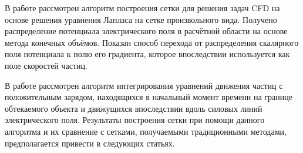 \documentclass[a4paper,12pt]{article}
\begin{document}
В работе рассмотрен алгоритм построения сетки для решения задач CFD на основе  решения уравнения Лапласа на сетке произвольного вида. Получено распределение потенциала электрического поля в расчётной области на основе метода конечных объёмов. Показан способ перехода от распределения скалярного поля потенциала к полю его градиента, которое впоследствии используется как поле скоростей частиц.

В работе рассмотрен алгоритм интегрирования уравнений движения частиц с положительным зарядом, находящихся в начальный момент времени на границе обтекаемого объекта и движущихся впоследствии вдоль силовых линий электрического поля. Результаты построения сетки при помощи данного алгоритма и их сравнение с сетками, получаемыми традиционными методами, предполагается привести в следующих статьях.

\nocite{кудрявцев2010краткий}
\nocite{ландау2001теоретическая}

\printbibliography
\end{document}
